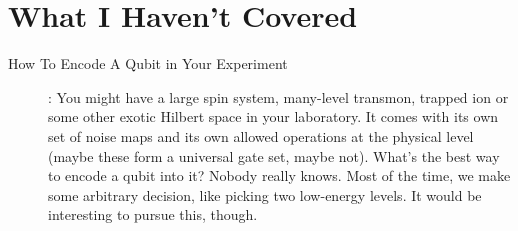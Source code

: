 \documentclass[10pt,a4paper, english]{scrartcl}
\begin{document}
\section{What I Haven't Covered}
\begin{description}
\item[How To Encode A Qubit in Your Experiment]: You might have a large spin system, many-level transmon, trapped ion or some other exotic Hilbert space in your laboratory.
It comes with its own set of noise maps and its own allowed operations at the physical level (maybe these form a universal gate set, maybe not).
What's the best way to encode a qubit into it?
Nobody really knows. 
Most of the time, we make some arbitrary decision, like picking two low-energy levels. 
It would be interesting to pursue this, though. 
\end{description}
\end{document}
